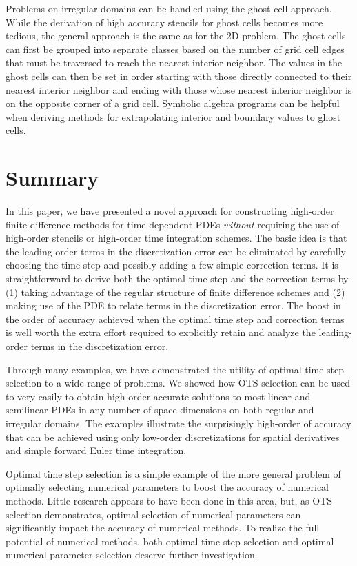 \documentclass[oneeqnum,onefignum,onetabnum,onethmnum]{siamltex}
\begin{document}
Problems on irregular domains can be handled using the ghost cell approach. 
While the derivation of high accuracy stencils for ghost cells becomes more
tedious, the general approach is the same as for the 2D problem.  The ghost 
cells can first be grouped into separate classes based on the number of 
grid cell edges that must be traversed to reach the nearest interior neighbor.
The values in the ghost cells can then be set in order starting with those 
directly connected to their nearest interior neighbor and ending with those 
whose nearest interior neighbor is on the opposite corner of a grid cell.
Symbolic algebra programs can be helpful when deriving methods for 
extrapolating interior and boundary values to ghost cells.


\section{\label{sec:summary} Summary} 
In this paper, we have presented a novel approach for constructing high-order
finite difference methods for time dependent PDEs \emph{without} requiring
the use of high-order stencils or high-order time integration schemes.  
The basic idea is that the leading-order terms in the discretization error
can be eliminated by carefully choosing the time step and possibly adding
a few simple correction terms.  It is straightforward to derive both the 
optimal time step and the correction terms by (1) taking advantage of the 
regular structure of finite difference schemes and (2) making use of the
PDE to relate terms in the discretization error.  The boost in the order
of accuracy achieved when the optimal time step and correction terms is well
worth the extra effort required to explicitly retain and analyze the 
leading-order terms in the discretization error.   

Through many examples, we have demonstrated the utility of optimal time step
selection to a wide range of problems.  We showed how OTS selection can be 
used to very easily to obtain high-order accurate solutions to most linear 
and semilinear PDEs in any number of space dimensions on both regular
and irregular domains.  The examples illustrate the surprisingly high-order
of accuracy that can be achieved using only low-order discretizations for 
spatial derivatives and simple forward Euler time integration.

Optimal time step selection is a simple example of the more general problem
of optimally selecting numerical parameters to boost the accuracy of 
numerical methods.  Little research appears to have been done in this area,
but, as OTS selection demonstrates, optimal selection of numerical parameters 
can significantly impact the accuracy of numerical methods.  To realize
the full potential of numerical methods, both optimal time step selection 
and optimal numerical parameter selection deserve further investigation.
\end{document}
